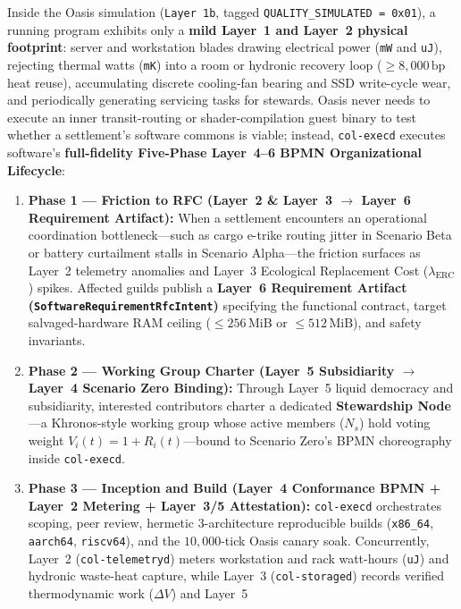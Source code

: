 Inside the Oasis simulation (\texttt{Layer 1b}, tagged \texttt{QUALITY\_SIMULATED = 0x01}), a running program exhibits
only a \textbf{mild Layer~1 and Layer~2 physical footprint}: server and workstation blades drawing electrical power
(\texttt{mW} and \texttt{uJ}), rejecting thermal watts (\texttt{mK}) into a room or hydronic recovery loop ($\ge
8{,}000\,\mathrm{bp}$ heat reuse), accumulating discrete cooling-fan bearing and SSD write-cycle wear, and
periodically generating servicing tasks for stewards. Oasis never needs to execute an inner transit-routing or
shader-compilation guest binary to test whether a settlement's software commons is viable; instead, \texttt{col-execd}
executes software's \textbf{full-fidelity Five-Phase Layer~4--6 BPMN Organizational Lifecycle}:
\begin{enumerate}
    \item \textbf{Phase 1 --- Friction to RFC (Layer~2 \& Layer~3 $\to$ Layer~6 Requirement Artifact):} When a
    settlement encounters an operational coordination bottleneck---such as cargo e-trike routing jitter in Scenario Beta
    or battery curtailment stalls in Scenario Alpha---the friction surfaces as Layer~2 telemetry anomalies and Layer~3
    Ecological Replacement Cost ($\lambda_{\mathrm{ERC}}$) spikes. Affected guilds publish a \textbf{Layer~6 Requirement
    Artifact (\texttt{SoftwareRequirementRfcIntent})} specifying the functional contract, target salvaged-hardware RAM
    ceiling ($\le 256\,\mathrm{MiB}$ or $\le 512\,\mathrm{MiB}$), and safety invariants.
    \item \textbf{Phase 2 --- Working Group Charter (Layer~5 Subsidiarity $\to$ Layer~4 Scenario Zero Binding):} Through
    Layer~5 liquid democracy and subsidiarity, interested contributors charter a dedicated \textbf{Stewardship Node}---a
    Khronos-style working group whose active members ($N_s$) hold voting weight $V_i(t) = 1 + R_i(t)$---bound to
    Scenario Zero's BPMN choreography inside \texttt{col-execd}.
    \item \textbf{Phase 3 --- Inception and Build (Layer~4 Conformance BPMN + Layer~2 Metering + Layer~3/5
    Attestation):} \texttt{col-execd} orchestrates scoping, peer review, hermetic 3-architecture reproducible builds
    (\texttt{x86\_64}, \texttt{aarch64}, \texttt{riscv64}), and the $10{,}000$-tick Oasis canary soak. Concurrently,
    Layer~2 (\texttt{col-telemetryd}) meters workstation and rack watt-hours (\texttt{uJ}) and hydronic waste-heat
    capture, while Layer~3 (\texttt{col-storaged}) records verified thermodynamic work ($\Delta V$) and Layer~5

\end{enumerate}
